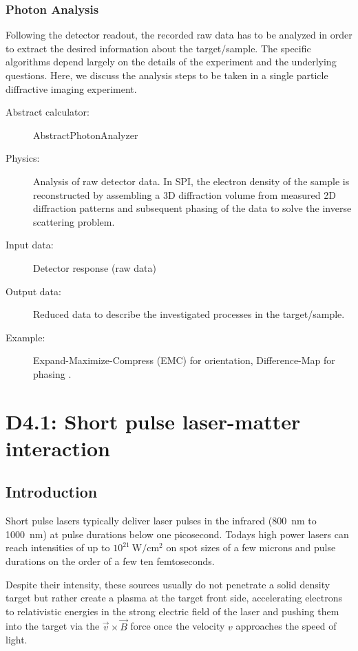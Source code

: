 \documentclass[a4paper]{article}
\begin{document}
\subsubsection{Photon Analysis}
Following the detector readout, the recorded raw data has to be analyzed in order to extract the desired information about the target/sample. The
specific algorithms depend largely on the details of the experiment and the underlying questions. Here, we discuss the analysis steps to be taken
in a single particle diffractive imaging experiment.
\begin{description}
  \item[Abstract calculator:] AbstractPhotonAnalyzer
  \item[Physics:]  Analysis of raw detector data. In SPI, the electron density of the sample is reconstructed by assembling a 3D diffraction volume
    from measured 2D diffraction patterns and subsequent phasing of the data to solve the inverse scattering problem.
  \item[Input data:] Detector response (raw data)
  \item[Output data:] Reduced data to describe the investigated processes in the target/sample.
  \item[Example:]  Expand-Maximize-Compress (EMC)  for orientation, Difference-Map for phasing \cite{Loh2009, s2e_recon_bitbucket}.
\end{description}

\section{D4.1: Short pulse laser-matter interaction\label{sec:short_pulse}}
%
\subsection{Introduction}
Short pulse lasers typically deliver laser pulses in the infrared (800~nm to 1000~nm) at pulse durations below one picosecond. Todays high power lasers can reach intensities of up to $10^{21}~\text{W}/\text{cm}^2$ on spot sizes of a few microns and pulse durations on the order of a few ten femtoseconds.

Despite their intensity, these sources usually do not penetrate a solid density target but rather create a plasma at the target front side, accelerating electrons to relativistic energies in the strong electric field of the laser and pushing them into the target via the $\vec{v}\times\vec{B}$ force once the velocity $v$ approaches the speed of light.
\end{document}

